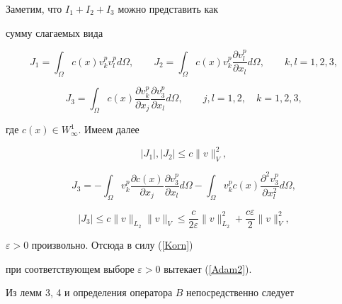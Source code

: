 \begin{pf} Заметим, что $ I_1 + I_2 +I_3 $ можно представить как


сумму слагаемых вида


$$


J_1 =\int_\Omega c(x)v_k^pv_l^p d\Omega, \qquad


J_2 = \int_\Omega c(x) v_k^p \frac{\partial v_l^p}{\partial x_l} d\Omega,


\qquad k,l = 1, 2, 3,


$$ 


$$


J_3 = \int_\Omega c(x) \frac{\partial v_k^p}{\partial x_j} 


\frac{\partial v_3^p}{\partial x_l} d\Omega,


\qquad j, l = 1, 2, \quad k = 1, 2, 3,


$$


где $ c(x) \in W^1_\infty $. Имеем далее 


$$


| J_1 |, | J_2 | \le c \| v \|_V^2,


$$


$$


J_3 = - \int_ \Omega v_k^p \frac{\partial c(x)}{\partial x_j} 


\frac{\partial v_3^p}{\partial x_l} d\Omega - 


\int_ \Omega v_k^p c(x) 


\frac{\partial^2 v_3^p}{\partial x_l^2} d\Omega,


$$


$$


| J_3 | \le c \| v \|_{L_2}\| v \|_V \le 


 \frac{c}{2 \varepsilon} \| v \|_{L_2}^2 + 


\frac{c \varepsilon}{2} \| v \|_V^2 ,


$$


$ \varepsilon > 0 $ произвольно. Отсюда в силу (\ref{Korn})


при соответствующем выборе $ \varepsilon > 0 $ вытекает (\ref{Adam2}). 


\end{pf}





Из лемм 3, 4 и определения оператора $ B $ непосредственно следует





